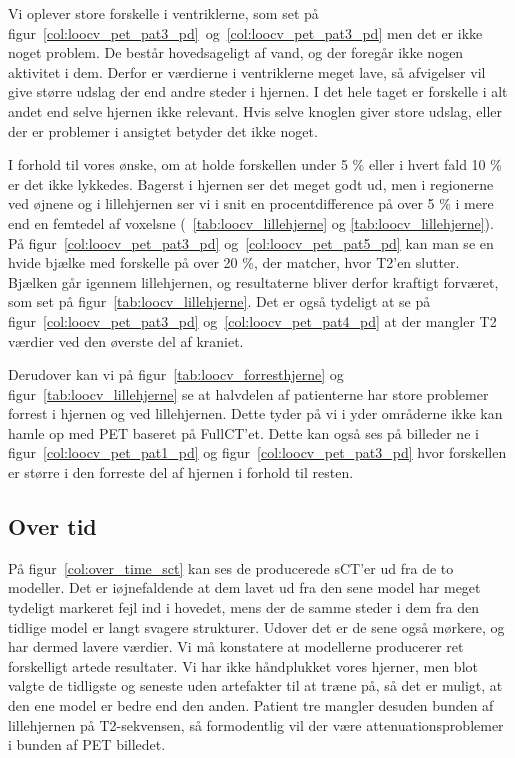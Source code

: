 Vi oplever store forskelle i ventriklerne, som set på figur~\ref{col:loocv_pet_pat3_pd}~og~\ref{col:loocv_pet_pat3_pd}  men det er ikke noget problem. De består hovedsageligt af vand, og der foregår ikke nogen aktivitet i dem. Derfor er værdierne i ventriklerne meget lave, så afvigelser vil give større udslag der end andre steder i hjernen. I det hele taget er forskelle i alt andet end selve hjernen ikke relevant. Hvis selve knoglen giver store udslag, eller der er problemer i ansigtet betyder det ikke noget.


I forhold til vores ønske, om at holde forskellen under 5 \% eller i hvert fald 10 \%  er det ikke lykkedes. Bagerst i hjernen ser det meget godt ud, men i regionerne ved øjnene og i lillehjernen ser vi i snit en procentdifference på over 5 \% i mere end en femtedel af voxelsne (~\ref{tab:loocv_lillehjerne} og \ref{tab:loocv_lillehjerne}). På figur~\ref{col:loocv_pet_pat3_pd} og~\ref{col:loocv_pet_pat5_pd}  kan man se en hvide bjælke med forskelle på over 20 \%, der matcher, hvor T2’en slutter. Bjælken går igennem lillehjernen, og resultaterne bliver derfor kraftigt forværet, som set på figur~\ref{tab:loocv_lillehjerne}. Det er også tydeligt at se på figur~\ref{col:loocv_pet_pat3_pd} og~\ref{col:loocv_pet_pat4_pd} at der mangler T2 værdier ved den øverste del af kraniet.


Derudover kan vi på figur~\ref{tab:loocv_forresthjerne} og figur~\ref{tab:loocv_lillehjerne} se at halvdelen af patienterne har store problemer forrest i hjernen og ved lillehjernen. Dette tyder på vi i yder områderne ikke kan hamle op med PET baseret på FullCT’et. Dette kan også ses på billeder ne i figur~\ref{col:loocv_pet_pat1_pd} og figur~\ref{col:loocv_pet_pat3_pd} hvor forskellen er større i den forreste del af hjernen i forhold til resten.

\subsection{Over tid}

På figur~\ref{col:over_time_sct} kan ses de producerede sCT’er ud fra
de to modeller. Det er iøjnefaldende at dem lavet ud fra den sene model
har meget tydeligt markeret fejl ind i hovedet, mens der de samme
steder i dem fra den tidlige model er langt svagere strukturer. Udover
det er de sene også mørkere, og har dermed lavere værdier. Vi må
konstatere at modellerne producerer ret forskelligt artede resultater.
Vi har ikke håndplukket vores hjerner, men blot valgte de tidligste
og seneste uden artefakter til at træne på, så det er muligt, at
den ene model er bedre end den anden. Patient tre mangler desuden
bunden af lillehjernen på T2-sekvensen, så formodentlig vil der være
attenuationsproblemer i bunden af PET billedet.


